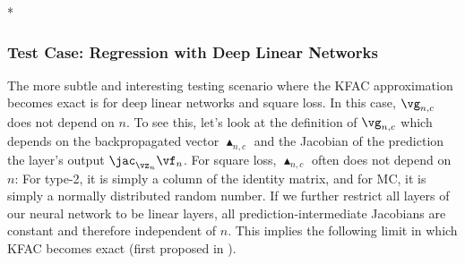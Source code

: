\switchcolumn[1]*
\switchcolumn[0]

\subsubsection{Test Case: Regression with Deep Linear Networks}

The more subtle and interesting testing scenario where the KFAC approximation becomes exact is for deep linear networks and square loss.
In this case, $\vg_{n,c}$ does not depend on $n$.
To see this, let's look at the definition of $\vg_{n,c}$ which depends on the backpropagated vector $\blacktriangle_{n,c}$ and the Jacobian of the prediction \wrt the layer's output $\jac_{\vz_n} \vf_n$.
For square loss, $\blacktriangle_{n,c}$ often does not depend on $n$: For type-2, it is simply a column of the identity matrix, and for MC, it is simply a normally distributed random number.
If we further restrict all layers of our neural network to be linear layers, all prediction-intermediate Jacobians are constant and therefore independent of $n$.
This implies the following limit in which KFAC becomes exact (first proposed in \cite{bernacchia2018exact}).

